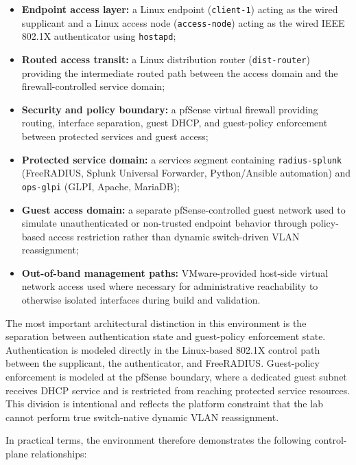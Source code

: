 \documentclass[11pt]{article}
\begin{document}
\begin{itemize}
    \item \textbf{Endpoint access layer:} a Linux endpoint (\texttt{client-1}) acting as the wired supplicant and a Linux access node (\texttt{access-node}) acting as the wired IEEE 802.1X authenticator using \texttt{hostapd};
    \item \textbf{Routed access transit:} a Linux distribution router (\texttt{dist-router}) providing the intermediate routed path between the access domain and the firewall-controlled service domain;
    \item \textbf{Security and policy boundary:} a pfSense virtual firewall providing routing, interface separation, guest DHCP, and guest-policy enforcement between protected services and guest access;
    \item \textbf{Protected service domain:} a services segment containing \texttt{radius-splunk} (FreeRADIUS, Splunk Universal Forwarder, Python/Ansible automation) and \texttt{ops-glpi} (GLPI, Apache, MariaDB);
    \item \textbf{Guest access domain:} a separate pfSense-controlled guest network used to simulate unauthenticated or non-trusted endpoint behavior through policy-based access restriction rather than dynamic switch-driven VLAN reassignment;
    \item \textbf{Out-of-band management paths:} VMware-provided host-side virtual network access used where necessary for administrative reachability to otherwise isolated interfaces during build and validation.
\end{itemize}

The most important architectural distinction in this environment is the separation between authentication state and guest-policy enforcement state. Authentication is modeled directly in the Linux-based 802.1X control path between the supplicant, the authenticator, and FreeRADIUS. Guest-policy enforcement is modeled at the pfSense boundary, where a dedicated guest subnet receives DHCP service and is restricted from reaching protected service resources. This division is intentional and reflects the platform constraint that the lab cannot perform true switch-native dynamic VLAN reassignment.

In practical terms, the environment therefore demonstrates the following control-plane relationships:
\end{document}
